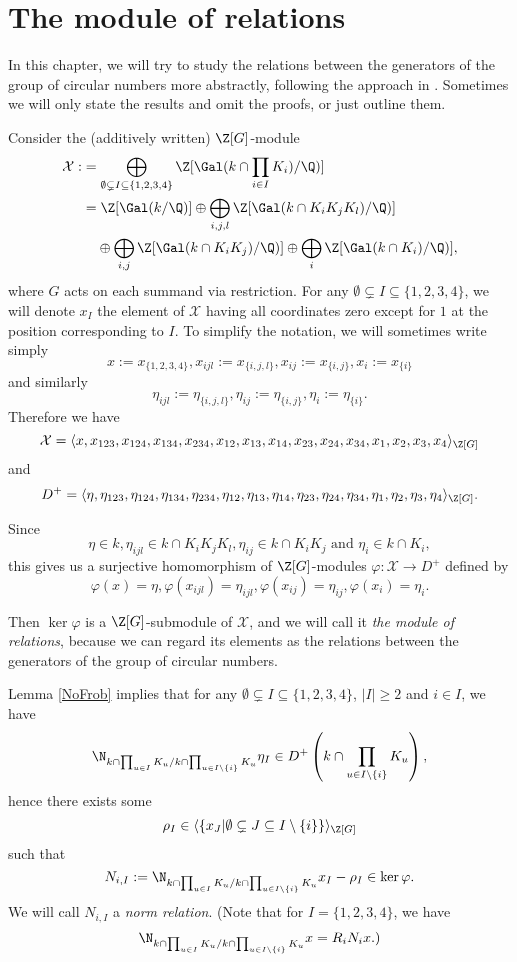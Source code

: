 \chapter{The module of relations}
In this chapter, we will try to study the relations between the generators of the group of circular numbers more abstractly, following the approach in \citep{Kucera2016}. Sometimes we will only state the results and omit the proofs, or just outline them.%

Consider the (additively written) $\Z[G]$-module
\begin{align*}
\mathcal{X}:&=\bigoplus_{\emptyset\subsetneq I \subseteq \{1,2,3,4\}} \Z[\Gal(k\cap \prod_{i\in I}K_i)/\Q)]\\
&=\Z[\Gal(k/\Q)] \oplus \bigoplus_{i,j,l} \Z[\Gal(k\cap K_iK_jK_l)/\Q)]\\
&\hphantom{{}=} \oplus \bigoplus_{i,j} \Z[\Gal(k\cap K_iK_j)/\Q)]\oplus \bigoplus_{i} \Z[\Gal(k\cap K_i)/\Q)],
\end{align*}
where $G$ acts on each summand via restriction. For any $\emptyset\subsetneq I \subseteq \{1,2,3,4\}$, we will denote $x_I$ the element of $\mathcal{X}$ having all coordinates zero except for $1$ at the position corresponding to $I$. To simplify the notation, we will sometimes write simply $$x:=x_{\{1,2,3,4\}},x_{ijl}:=x_{\{i,j,l\}},x_{ij}:=x_{\{i,j\}},x_{i}:=x_{\{i\}}$$ and similarly $$\eta_{ijl}:=\eta_{\{i,j,l\}},\eta_{ij}:=\eta_{\{i,j\}},\eta_{i}:=\eta_{\{i\}}.$$
Therefore we have 
$$\mathcal{X}=\langle x,x_{123},x_{124},x_{134},x_{234}, x_{12},x_{13},x_{14},x_{23},x_{24},x_{34},x_{1},x_{2},x_{3},x_{4}\rangle_{\Z[G]}$$
and
$$D^+=\langle \eta,\eta_{123},\eta_{124},\eta_{134},\eta_{234}, \eta_{12},\eta_{13},\eta_{14},\eta_{23},\eta_{24},\eta_{34},\eta_{1},\eta_{2},\eta_{3},\eta_{4}\rangle_{\Z[G]}.$$

Since $$\eta\in k, \eta_{ijl}\in k\cap K_iK_jK_l, \eta_{ij}\in k\cap K_iK_j \text{ and } \eta_{i}\in k\cap K_i,$$ this gives us a surjective homomorphism of $\Z[G]$-modules $\varphi:\mathcal{X}\to D^+$ defined by $$\varphi(x)=\eta, \varphi(x_{ijl})=\eta_{ijl}, \varphi(x_{ij})=\eta_{ij}, \varphi(x_{i})=\eta_{i}.$$

Then $\ker\varphi$ is a $\Z[G]$-submodule of $\mathcal{X}$, and we will call it \textit{the module of relations}, because we can regard its elements as the relations between the generators of the group of circular numbers.

Lemma \ref{NoFrob} implies that for any $\emptyset\subsetneq I \subseteq \{1,2,3,4\}$, $|I|\geq 2$ and $i\in I$, we have
$$\N_{k\cap \prod_{u\in I}K_u/ k \cap \prod_{u\in I\setminus{\{i\}}}K_u} \eta_I\in D^+\left( k \cap \prod_{u\in I\setminus{\{i\}}}K_u\right),$$
hence there exists some $$\rho_I\in \langle \{x_J | \emptyset\subsetneq J \subseteq I \setminus{\{i\}} \}\rangle_{\Z[G]}$$
 such that $$N_{i,I}:=\N_{k\cap \prod_{u\in I}K_u/ k \cap \prod_{u\in I\setminus{\{i\}}}K_u}x_I-\rho_I \in \ker \varphi.$$
 We will call $N_{i,I}$ a \textit{norm relation}.
 (Note that for $I=\{1,2,3,4\}$, we have $$\N_{k\cap \prod_{u\in I}K_u/ k \cap \prod_{u\in I\setminus{\{i\}}}K_u}x=R_iN_i x.)$$

